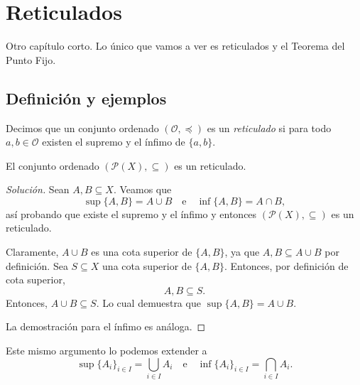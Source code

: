 \chapter{Reticulados}

Otro capítulo corto. Lo único que vamos a ver es reticulados y el Teorema del Punto Fijo.

\section{Definición y ejemplos}

\begin{definition}
	Decimos que un conjunto ordenado $(\mathcal{O}, \preceq)$ es un \emph{reticulado} si para todo $a, b \in \mathcal{O}$ existen el supremo y el ínfimo de $\{ a, b \}$.
\end{definition}

\begin{example}
	El conjunto ordenado $(\mathcal{P}(X), \subseteq)$ es un reticulado.
\end{example}

\begin{proof}[Solución]
	Sean $A, B \subseteq X$. Veamos que
	\begin{equation*}
		\sup \{ A, B \} = A \cup B \quad \text{e} \quad \inf \{ A, B \} = A \cap B,
	\end{equation*}
	así probando que existe el supremo y el ínfimo y entonces $(\mathcal{P}(X), \subseteq)$ es un reticulado.

	Claramente, $A \cup B$ es una cota superior de $\{ A, B \}$, ya que $A, B \subseteq A \cup B$ por definición. Sea $S \subseteq X$ una cota superior de $\{ A, B \}$. Entonces, por definición de cota superior,
	\begin{equation*}
		A, B \subseteq S.
	\end{equation*}
	Entonces, $A \cup B \subseteq S$. Lo cual demuestra que $\sup \{ A, B \} = A \cup B$.

	La demostración para el ínfimo es análoga.
\end{proof}

\begin{remark}
	Este mismo argumento lo podemos extender a
	\begin{equation*}
		\sup \{ A_i \}_{i \in I} = \bigcup_{i \in I} A_i \quad \text{e} \quad \inf \{ A_i \}_{i \in I} = \bigcap_{i \in I} A_i.
	\end{equation*}
\end{remark}

